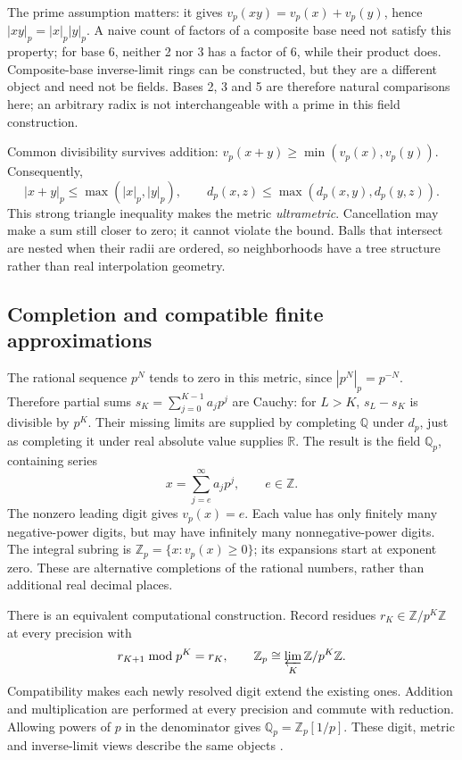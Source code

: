 \documentclass[11pt]{article}
\newcommand{\Q}{\mathbb{Q}}
\newcommand{\R}{\mathbb{R}}
\newcommand{\Z}{\mathbb{Z}}
\newcommand{\vp}{v_p}
\newcommand{\Qp}{\mathbb{Q}_p}
\newcommand{\Zp}{\mathbb{Z}_p}
\begin{document}
The prime assumption matters: it gives
\(\vp(xy)=\vp(x)+\vp(y)\), hence \(|xy|_p=|x|_p|y|_p\).
A naive count of factors of a composite base need not satisfy this property;
for base 6, neither 2 nor 3 has a factor of 6, while their product does.
Composite-base inverse-limit rings can be constructed, but they are a
different object and need not be fields. Bases 2, 3 and 5 are therefore
natural comparisons here; an arbitrary radix is not interchangeable with a
prime in this field construction.

Common divisibility survives addition:
\(\vp(x+y)\geq\min(\vp(x),\vp(y))\). Consequently,
\[
 |x+y|_p\leq\max(|x|_p,|y|_p),\qquad
 d_p(x,z)\leq\max(d_p(x,y),d_p(y,z)).
\]
This strong triangle inequality makes the metric \emph{ultrametric}.
Cancellation may make a sum still closer to zero; it cannot violate the
bound. Balls that intersect are nested when their radii are ordered, so
neighborhoods have a tree structure rather than real interpolation geometry.

\subsection{Completion and compatible finite approximations}

The rational sequence \(p^N\) tends to zero in this metric, since
\(|p^N|_p=p^{-N}\). Therefore partial sums
\(s_K=\sum_{j=0}^{K-1}a_jp^j\) are Cauchy: for \(L>K\),
\(s_L-s_K\) is divisible by \(p^K\). Their missing limits are supplied by
completing \(\Q\) under \(d_p\), just as completing it under real absolute
value supplies \(\R\). The result is the field \(\Qp\), containing series
\[
 x=\sum_{j=e}^{\infty}a_jp^j,\qquad e\in\Z.
\]
The nonzero leading digit gives \(\vp(x)=e\). Each value has only finitely
many negative-power digits, but may have infinitely many nonnegative-power
digits. The integral subring is \(\Zp=\{x:\vp(x)\geq0\}\); its expansions
start at exponent zero. These are alternative completions of the rational
numbers, rather than additional real decimal places.

There is an equivalent computational construction. Record residues
\(r_K\in\Z/p^K\Z\) at every precision with
\[
 r_{K+1}\bmod p^K=r_K,\qquad
 \Zp\cong\varprojlim_K\Z/p^K\Z.
\]
Compatibility makes each newly resolved digit extend the existing ones.
Addition and multiplication are performed at every precision and commute
with reduction. Allowing powers of \(p\) in the denominator gives
\(\Qp=\Zp[1/p]\). These digit, metric and inverse-limit views describe the
same objects \citep{caruso2017computations}.
\end{document}
